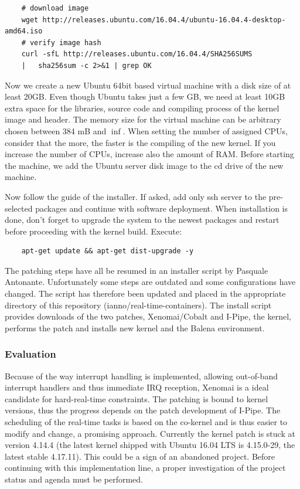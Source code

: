 \documentclass[]{scrartcl}
\begin{document}
\begin{verbatim}
	# download image
	wget http://releases.ubuntu.com/16.04.4/ubuntu-16.04.4-desktop-amd64.iso
	# verify image hash
	curl -sfL http://releases.ubuntu.com/16.04.4/SHA256SUMS
	|	sha256sum -c 2>&1 | grep OK
\end{verbatim}

Now we create a new Ubuntu 64bit based virtual machine with a disk size of at least 20GB. Even though Ubuntu takes just a few GB, we need at least 10GB extra space for the libraries, source code and compiling process of the kernel image and header. 
The memory size for the virtual machine can be arbitrary chosen between 384 mB and $\inf$. When setting the number of assigned CPUs, consider that the more, the faster is the compiling of the new kernel. If you increase the number of CPUs, increase also the amount of RAM.
Before starting the machine, we add the Ubuntu server disk image to the cd drive of the new machine.

Now follow the guide of the installer. If asked, add only ssh server to the pre-selected packages and continue with software deployment. When installation is done, don't forget to upgrade the system to the newest packages and restart before proceeding with the kernel build. Execute:

\begin{verbatim}
	apt-get update && apt-get dist-upgrade -y
\end{verbatim}

The patching steps have all be resumed in an installer script by Pasquale Antonante. Unfortunately some steps are outdated and some configurations have changed. The script has therefore been updated and placed in the appropriate directory of this repository (ianno/real-time-containers). The install script provides downloads of the two patches, Xenomai/Cobalt and I-Pipe, the kernel, performs the patch and installs new kernel and the Balena environment.

\subsubsection{Evaluation}

Because of the way interrupt handling is implemented, allowing out-of-band interrupt handlers and thus immediate IRQ reception, Xenomai is a ideal candidate for hard-real-time constraints. The patching is bound to kernel versions, thus the progress depends on the patch development of I-Pipe. 
The scheduling of the real-time tasks is based on the co-kernel and is thus easier to modify and change, a promising approach.
Currently the kernel patch is stuck at version 4.14.4 (the latest kernel shipped with Ubuntu 16.04 LTS is 4.15.0-29, the latest stable 4.17.11). This could be a sign of an abandoned project. Before continuing with this implementation line, a proper investigation of the project status and agenda must be performed.
\end{document}
